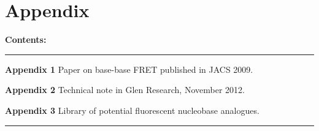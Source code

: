 %


\chapter{Appendix}
\label{chap:appendix1}
\vfill
\large
\textbf{Contents:}

\normalsize
\noindent\rule[2pt]{\textwidth}{0.8pt}

\textbf{Appendix 1    } Paper on base-base FRET published in JACS 2009.

\textbf{Appendix 2    } Technical note in Glen Research, November 2012.

\textbf{Appendix 3    } Library of potential fluorescent nucleobase analogues.

\noindent\rule[2pt]{\textwidth}{0.8pt}

\clearpage

\clearpage

\clearpage





